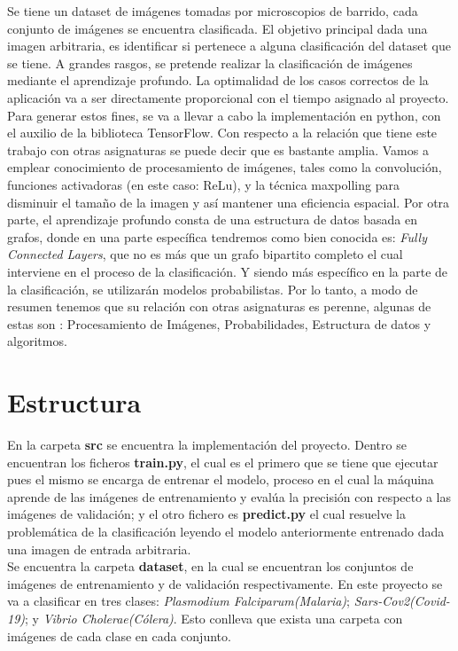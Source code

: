 \documentclass{book}
\begin{document}
			Se tiene un dataset de im\'agenes tomadas por microscopios de barrido, cada conjunto de im\'agenes se encuentra clasificada. El objetivo principal dada una imagen arbitraria, es identificar si pertenece a alguna clasificaci\'on del dataset que se tiene. A grandes rasgos, se pretende realizar la clasificaci\'on de im\'agenes mediante el aprendizaje profundo. La optimalidad de los casos correctos de la aplicaci\'on va a ser directamente proporcional con el tiempo asignado al proyecto. Para generar estos fines, se va a llevar a cabo la implementaci\'on en python, con el auxilio de la biblioteca TensorFlow.
			Con respecto a la relaci\'on que tiene este trabajo con otras asignaturas se puede decir que es bastante amplia. Vamos a emplear conocimiento de procesamiento de im\'agenes, tales como la convoluci\'on, funciones activadoras (en este caso: ReLu), y la t\'ecnica maxpolling para disminuir el tama\~no de la imagen y as\'i mantener una eficiencia espacial. Por otra parte, el aprendizaje profundo consta de una estructura de datos basada en grafos, donde en una parte espec\'ifica tendremos como bien conocida es: \textit{Fully Connected Layers}, que no es m\'as que un grafo bipartito completo el cual interviene en el proceso de la clasificaci\'on. Y siendo m\'as espec\'ifico en la parte de la clasificaci\'on, se utilizar\'an modelos probabilistas. Por lo tanto, a modo de resumen tenemos que su relaci\'on con otras asignaturas es perenne, algunas de estas son : Procesamiento de Im\'agenes, Probabilidades, Estructura de datos y algoritmos.

			
		\section{Estructura} \label{estructSec}
			En la carpeta \textbf{src} se encuentra la implementaci\'on del proyecto. Dentro se encuentran los ficheros \textbf{train.py}, el cual es el primero que se tiene que ejecutar pues el mismo se encarga de entrenar el modelo, proceso en el cual la m\'aquina aprende de las im\'agenes de entrenamiento y eval\'ua la precisi\'on con respecto a las im\'agenes de validaci\'on; y el otro fichero es \textbf{predict.py} el cual resuelve la problem\'atica de la clasificaci\'on leyendo el modelo anteriormente entrenado dada una imagen de entrada arbitraria. \\
			Se encuentra la carpeta \textbf{dataset}, en la cual se encuentran los conjuntos de im\'agenes de entrenamiento y de validaci\'on respectivamente. En este proyecto se va a clasificar en tres clases: \textit{Plasmodium Falciparum(Malaria)}; \textit{Sars-Cov2(Covid-19)}; y \textit{Vibrio Cholerae(C\'olera)}. Esto conlleva que exista una carpeta con im\'agenes de cada clase en cada conjunto.
	
\end{document}
